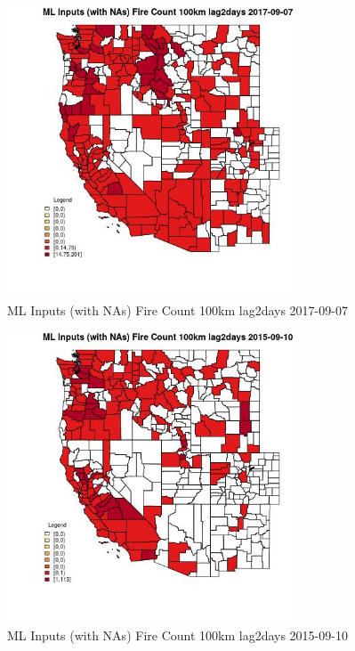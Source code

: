 \clearpage 

\begin{figure} 
\centering  
\includegraphics[width=0.77\textwidth]{Code_Outputs/Report_ML_input_PM25_Step4_part_e_de_duplicated_aves_compiled_2019-05-21wNAs_CountyFire_Count_100km_lag2daysMean2017-09-07.jpg} 
\caption{\label{fig:Report_ML_input_PM25_Step4_part_e_de_duplicated_aves_compiled_2019-05-21wNAsCountyFire_Count_100km_lag2daysMean2017-09-07}ML Inputs (with NAs) Fire Count 100km lag2days 2017-09-07} 
\end{figure} 
 

\begin{figure} 
\centering  
\includegraphics[width=0.77\textwidth]{Code_Outputs/Report_ML_input_PM25_Step4_part_e_de_duplicated_aves_compiled_2019-05-21wNAs_CountyFire_Count_100km_lag2daysMean2015-09-10.jpg} 
\caption{\label{fig:Report_ML_input_PM25_Step4_part_e_de_duplicated_aves_compiled_2019-05-21wNAsCountyFire_Count_100km_lag2daysMean2015-09-10}ML Inputs (with NAs) Fire Count 100km lag2days 2015-09-10} 
\end{figure} 
 

